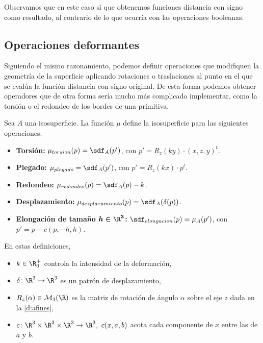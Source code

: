 Observamos que en este caso sí que obtenemos funciones distancia con signo como resultado, al contrario de lo que ocurría con las operaciones booleanas.

\subsection{Operaciones deformantes}
Siguiendo el mismo razonamiento, podemos definir operaciones que modifiquen la geometría de la superficie aplicando rotaciones o traslaciones al punto en el que se evalúa la función distancia con signo original. De esta forma podemos obtener operadores que de otra forma sería mucho más complicado implementar, como la torsión o el redondeo de los bordes de una primitiva.

\begin{definicion}
    Sea $A$ una isosuperficie. La función $\mu$ define la isosuperficie para las siguientes operaciones.
    \begin{itemize}
        
        \item \textbf{Torsión: } $\mu_{torsion}(p) = \sdf_{A}(p')$, con $p' = R_z(ky)\cdot (x,z,y)^t$.
        \item \textbf{Plegado: } $\mu_{plegado} =\sdf_{A}(p')$, con $p' = R_z(kx)\cdot p^t$.
        \item \textbf{Redondeo: } $\mu_{redondeo}(p) = \sdf_{A}(p) - k$.
        \item \textbf{Desplazamiento: } $\mu_{desplazamiento}(p) = \sdf_{A}(\delta(p))$.
        \item \textbf{Elongación de tamaño $\boldsymbol{h\in \R^3}$: } $\sdf_{elongacion}(p) = \mu_{A}(p')$, con $p' = p - c(p, -h, h)$.
    \end{itemize}
    En estas definiciones,
    \begin{itemize}
        \item $k\in \R^+_0$ controla la intensidad de la deformación,
        \item $\delta\colon \R^3\to \R^3$ es un patrón de desplazamiento,
        \item $R_z(\alpha)\in \mathcal{M}_3(\R)$ es la matriz de rotación de ángulo $\alpha$ sobre el eje $z$ dada en la \autoref{d:afines},
        \item $c\colon \R^3\times \R^3 \times \R^3 \to \R^3,\ c(x,a,b)$ acota cada componente de $x$ entre las de $a$ y $b$.
    \end{itemize}
\end{definicion}

